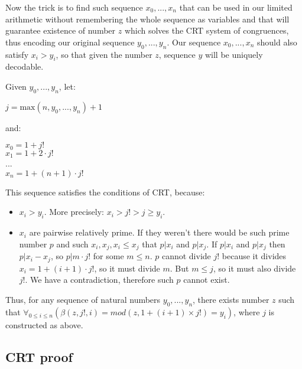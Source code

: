 \documentclass{article}
\begin{document}
Now the trick is to find such sequence $x_0, ..., x_n$ that can be used in our limited arithmetic
without remembering the whole sequence as variables and that will guarantee existence of number $z$
which solves the CRT system of congruences, thus encoding our original sequence $y_0, ..., y_n$.
Our sequence $x_0, ..., x_n$ should also satisfy $x_i > y_i$, so that given the number $z$,
sequence $y$ will be uniquely decodable.

Given $y_0, ..., y_n$, let:

\begin{center}
    $j = \text{max}(n, y_0, ..., y_n) + 1$
\end{center}

and:

\begin{center}
    $x_0 = 1 + j!$\\
    $x_1 = 1 + 2 \cdot j!$\\
    ...\\
    $x_n = 1 + (n + 1) \cdot j!$
\end{center}

This sequence satisfies the conditions of CRT, because:

\begin{itemize}
    \item $x_i > y_i$. More precisely: $x_i > j! > j \geqslant y_i$.
    \item $x_i$ are pairwise relatively prime. If they weren't there would be such prime number $p$
        and such $x_i, x_j, x_i \leq x_j$ that $p | x_i$ and $p | x_j$. If $p | x_i$ and $p | x_j$
        then $p | x_i - x_j$, so $p | m \cdot j!$ for some $m \leqslant n$. $p$ cannot divide $j!$
        because it divides $x_i = 1 + (i+1) \cdot j!$, so it must divide $m$. But $m \leqslant j$,
        so it must also divide $j!$. We have a contradiction, therefore such $p$ cannot exist.
\end{itemize}

Thus, for any sequence of natural numbers $y_0, ..., y_n$, there exists number $z$
such that $\forall_{0 \leqslant i \leqslant n}(\beta(z, j!, i) = mod(z, 1 + (i + 1) \times j!) = y_i)$,
where $j$ is constructed as above.

\subsection{CRT proof}



\end{document}
